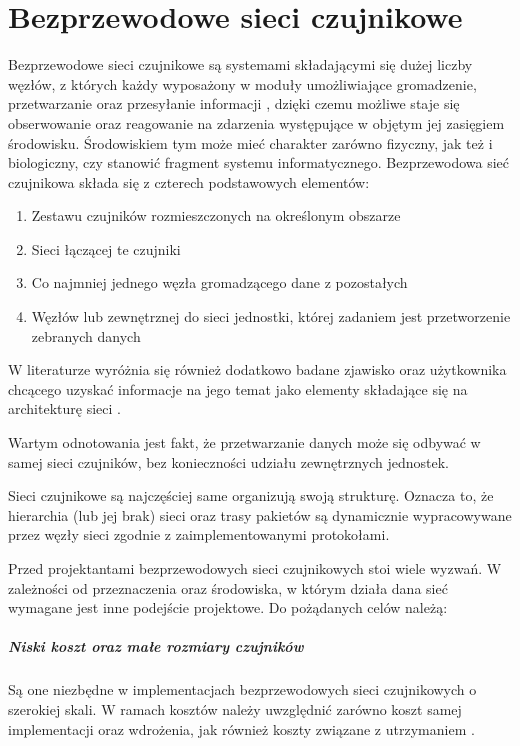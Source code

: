 \chapter{Bezprzewodowe sieci czujnikowe}
Bezprzewodowe sieci czujnikowe są systemami składającymi się dużej liczby węzłów, z których każdy wyposażony w moduły umożliwiające gromadzenie, przetwarzanie oraz przesyłanie informacji \cite{Ilyas2004}, dzięki czemu możliwe staje się obserwowanie oraz reagowanie na zdarzenia występujące w objętym jej zasięgiem środowisku. Środowiskiem tym może mieć charakter zarówno fizyczny, jak też i biologiczny, czy stanowić fragment systemu informatycznego. 
\cite{Sohraby2006}
Bezprzewodowa sieć czujnikowa składa się z czterech podstawowych elementów\cite{Karl2006}:
\begin{enumerate}
	\item Zestawu czujników rozmieszczonych na określonym obszarze
	\item Sieci łączącej te czujniki
	\item Co najmniej jednego węzła gromadzącego dane z pozostałych
	\item Węzłów lub zewnętrznej do sieci jednostki, której zadaniem jest przetworzenie zebranych danych
\end{enumerate}
W literaturze wyróżnia się również dodatkowo badane zjawisko oraz użytkownika chcącego uzyskać informacje na jego temat jako elementy składające się na architekturę sieci \cite{Tilak2002}.

Wartym odnotowania jest fakt, że przetwarzanie danych może się odbywać w samej sieci czujników, bez konieczności udziału zewnętrznych jednostek.

Sieci czujnikowe są najczęściej same organizują swoją strukturę. Oznacza to, że hierarchia (lub jej brak) sieci oraz trasy pakietów są dynamicznie wypracowywane przez węzły sieci zgodnie z zaimplementowanymi protokołami.

Przed projektantami bezprzewodowych sieci czujnikowych stoi wiele wyzwań. W zależności od przeznaczenia oraz środowiska, w którym działa dana sieć wymagane jest inne podejście projektowe. Do pożądanych celów należą:
\paragraph{Niski koszt oraz małe rozmiary czujników}
Są one niezbędne w implementacjach bezprzewodowych sieci czujnikowych o szerokiej skali. W ramach kosztów należy uwzględnić zarówno koszt samej implementacji oraz wdrożenia, jak również koszty związane z utrzymaniem \cite{Howitt2006}.

